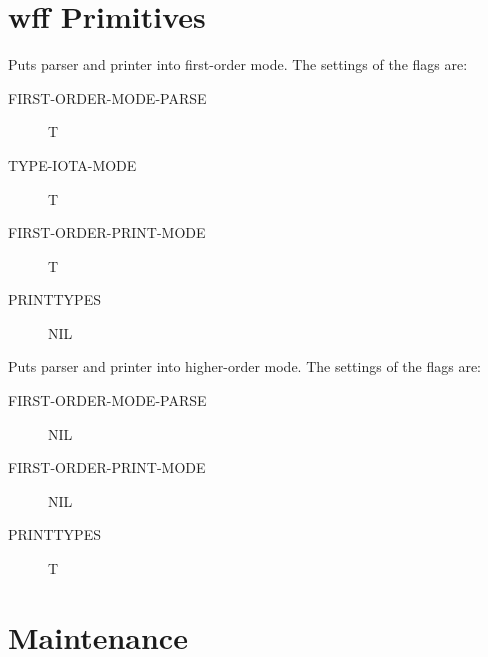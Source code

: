 \section{wff Primitives}

\begin{description} 
\item[FIRST-ORDER]  
Puts parser and printer into first-order mode. The settings of the flags are:
\begin{description}
\item[FIRST-ORDER-MODE-PARSE] T

\item[TYPE-IOTA-MODE] T

\item[FIRST-ORDER-PRINT-MODE] T

\item[PRINTTYPES] NIL

\end{description}

\item[HIGHER-ORDER]  
Puts parser and printer into higher-order mode. The settings of the flags are:
\begin{description}
\item[FIRST-ORDER-MODE-PARSE] NIL

\item[FIRST-ORDER-PRINT-MODE] NIL

\item[PRINTTYPES] T

\end{description}

\item
\end{description}

\section{Maintenance}

